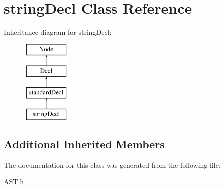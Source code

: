 \hypertarget{classstringDecl}{\section{string\-Decl Class Reference}
\label{classstringDecl}
}
Inheritance diagram for string\-Decl\-:\begin{figure}[H]
\begin{center}
\leavevmode
\includegraphics[height=4.000000cm]{classstringDecl}
\end{center}
\end{figure}
\subsection*{Additional Inherited Members}


The documentation for this class was generated from the following file\-:\begin{DoxyCompactItemize}
\item 
A\-S\-T.\-h\end{DoxyCompactItemize}
